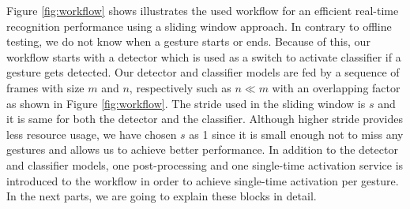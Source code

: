 Figure \ref{fig:workflow} shows illustrates the used workflow for an efficient real-time recognition performance using a sliding window approach. In contrary to offline testing, we do not know when a gesture starts or ends. Because of this, our workflow starts with a detector which is used as a switch to activate classifier if a gesture gets detected. Our detector and classifier models are fed by a sequence of frames with size $m$ and $n$, respectively such as $n \ll m$ with an overlapping factor as shown in Figure \ref{fig:workflow}. The stride used in the sliding window is $s$ and it is same for both the detector and the classifier. Although higher stride provides less resource usage, we have chosen $s$ as 1 since it is small enough not to miss any gestures and allows us to achieve better performance. In addition to the detector and classifier models, one post-processing and one single-time activation service is introduced to the workflow in order to achieve single-time activation per gesture. In the next parts, we are going to explain these blocks in detail.\\


